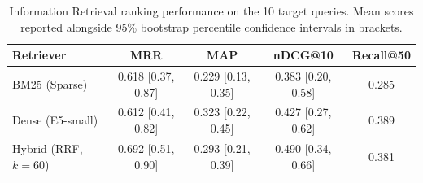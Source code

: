 \begin{table}[t]
\centering
\small
\begin{tabular}{lcccc}
\toprule
\textbf{Retriever} & \textbf{MRR} & \textbf{MAP} & \textbf{nDCG@10} & \textbf{Recall@50} \\
\midrule
BM25 (Sparse) & 0.618 [0.37, 0.87] & 0.229 [0.13, 0.35] & 0.383 [0.20, 0.58] & 0.285 \\
Dense (E5-small) & 0.612 [0.41, 0.82] & 0.323 [0.22, 0.45] & 0.427 [0.27, 0.62] & 0.389 \\
Hybrid (RRF, $k=60$) & 0.692 [0.51, 0.90] & 0.293 [0.21, 0.39] & 0.490 [0.34, 0.66] & 0.381 \\
\bottomrule
\end{tabular}
\caption{Information Retrieval ranking performance on the 10 target queries. Mean scores reported alongside 95\% bootstrap percentile confidence intervals in brackets.}
\label{tab:retrieval_metrics}
\end{table}